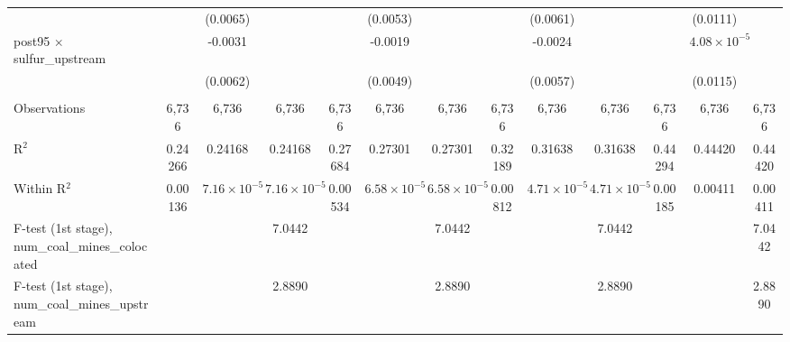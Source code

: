 \begin{table}[htbp]
\begin{adjustbox}{width = \textwidth, center}
\begin{tabular}{lcccccccccccc}
                                                            &                 & (0.0065)              &                       &                 & (0.0053)              &                       &                 & (0.0061)              &                       &               & (0.0111)              &   \\   
         post95 $\times$ sulfur\_upstream                   &                 & -0.0031               &                       &                 & -0.0019               &                       &                 & -0.0024               &                       &               & $4.08\times 10^{-5}$  &   \\   
                                                            &                 & (0.0062)              &                       &                 & (0.0049)              &                       &                 & (0.0057)              &                       &               & (0.0115)              &   \\   
          \\
         Observations                                       & 6,736           & 6,736                 & 6,736                 & 6,736           & 6,736                 & 6,736                 & 6,736           & 6,736                 & 6,736                 & 6,736         & 6,736                 & 6,736\\  
         R$^2$                                              & 0.24266         & 0.24168               & 0.24168               & 0.27684         & 0.27301               & 0.27301               & 0.32189         & 0.31638               & 0.31638               & 0.44294       & 0.44420               & 0.44420\\  
         Within R$^2$                                       & 0.00136         & $7.16\times 10^{-5}$  & $7.16\times 10^{-5}$  & 0.00534         & $6.58\times 10^{-5}$  & $6.58\times 10^{-5}$  & 0.00812         & $4.71\times 10^{-5}$  & $4.71\times 10^{-5}$  & 0.00185       & 0.00411               & 0.00411\\  
         F-test (1st stage), num\_coal\_mines\_colocated    &                 &                       & 7.0442                &                 &                       & 7.0442                &                 &                       & 7.0442                &               &                       & 7.0442\\  
         F-test (1st stage), num\_coal\_mines\_upstream     &                 &                       & 2.8890                &                 &                       & 2.8890                &                 &                       & 2.8890                &               &                       & 2.8890\\  

\end{tabular}
\end{adjustbox}
\end{table}
